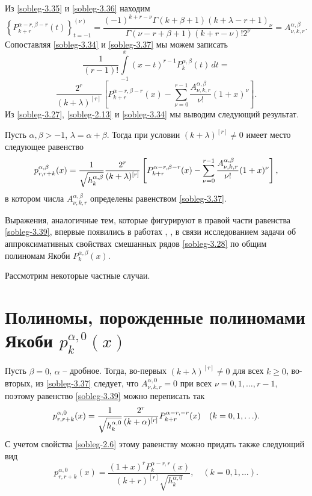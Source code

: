 Из \eqref{sobleg-3.35}  и \eqref{sobleg-3.36} находим
\begin{equation}\label{sobleg-3.37}
\left\{P_{k+r}^{\alpha-r,\beta-r}(t)\right\}_{t=-1}^{(\nu)}=
\frac{(-1)^{k+r-\nu}\Gamma(k+\beta+1)(k+\lambda-r+1)_{\nu}}
{\Gamma(\nu-r+\beta+1)(k+r-\nu)!2^\nu}
=A_{\nu,k,r}^{\alpha,\beta}.
\end{equation}
Сопоставляя \eqref{sobleg-3.34} и \eqref{sobleg-3.37} мы можем записать
$$\frac{1}{(r-1)!}\int\limits^x_{-1}(x-t)^{r-1}P_k^{\alpha,\beta}(t)\,dt=$$
\begin{equation}\label{sobleg-3.38}
\frac{2^r}{(k+\lambda)^{[r]}}\left[P_{k+r}^{\alpha-r,\beta-r}(x)
-\sum^{r-1}_{\nu=0}\frac{A_{\nu,k,r}^{\alpha,\beta}}{\nu!}(1+x)^{\nu}\right].
\end{equation}
Из \eqref{sobleg-3.27}, \eqref{sobleg-2.13} и \eqref{sobleg-3.34} мы выводим следующий результат.

\begin{theorem}\label{soblegtheo2}
Пусть $\alpha, \beta>-1$, $\lambda=\alpha+\beta$. Тогда  при условии $(k+\lambda)^{[r]}\neq0$ имеет место следующее равенство
\begin{equation}\label{sobleg-3.39}
p_{r,r+k}^{\alpha,\beta}(x) ={1\over\sqrt{ h_k^{\alpha,\beta}}}
\frac{2^r}{(k+\lambda)^{[r]}}\left[P_{k+r}^{\alpha-r,\beta-r}(x)
-\sum^{r-1}_{\nu=0}\frac{A_{\nu,k,r}^{\alpha,\beta}}{\nu!}(1+x)^{\nu}\right] ,
\end{equation}
в котором числа $A_{\nu,k,r}^{\alpha,\beta}$ определены равенством \eqref{sobleg-3.37}.
\end{theorem}

\begin{remark}
  Выражения, аналогичные тем, которые фигурируют в правой части равенства  \eqref{sobleg-3.39}, впервые появились в   работах \cite{sobleg-Shar13}, \cite{sobleg-Shar17}, \cite{sobleg-Shar18} в связи исследованием задачи об аппроксимативных свойствах смешанных рядов \eqref{sobleg-3.28} по общим полиномам Якоби $P_{k}^{\alpha,\beta}(x)$.
\end{remark}


Рассмотрим некоторые частные случаи.

\section{Полиномы, порожденные полиномами Якоби $p_{k}^{\alpha,0}(x)$}
Пусть $\beta=0$, $\alpha$ -- дробное. Тогда, во-первых $(k+\lambda)^{[r]}\neq0$ для всех $k\ge0$, во-вторых,  из \eqref{sobleg-3.37} следует, что $A_{\nu,k,r}^{\alpha,0}=0$ при всех  $\nu=0,1,\dots, r-1$, поэтому равенство \eqref{sobleg-3.39} можно переписать так
\begin{equation}\label{sobleg-3.40}
p_{r,r+k}^{\alpha,0}(x) ={1\over\sqrt{ h_k^{\alpha,0}}}
\frac{2^r}{(k+\alpha)^{[r]}}P_{k+r}^{\alpha-r,-r}(x) \quad (k=0,1,\ldots).
\end{equation}
С учетом свойства \eqref{sobleg-2.6} этому равенству можно придать также следующий вид
\begin{equation}\label{sobleg-3.41}
p_{r,r+k}^{\alpha,0}(x) =
\frac{(1+x)^rP_{k}^{\alpha-r,r}(x)}{(k+r)^{[r]}\sqrt{ h_k^{\alpha,0}}},
 \quad (k=0,1,\ldots).
\end{equation}

